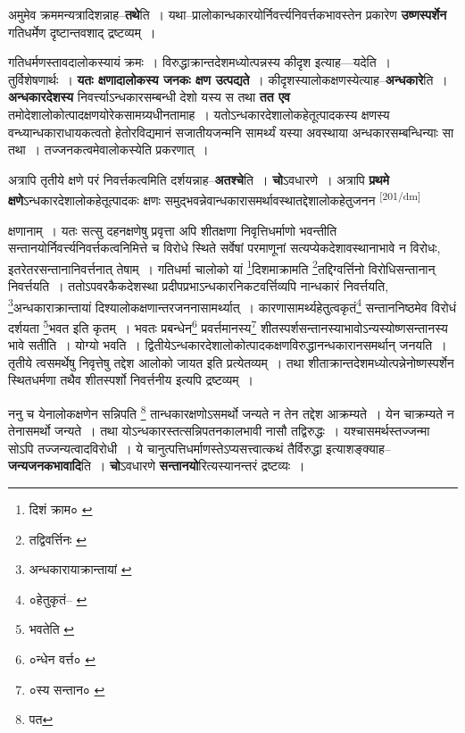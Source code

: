 \documentclass[article,12pt,a4paper]{memoir}
\begin{document}
	  \pstart अमुमेव क्रममन्यत्रादिशन्नाह--\textbf{तथे}ति । यथा--प्रालोकान्धकारयोर्निवर्त्त्यनिवर्त्तकभावस्तेन प्रकारेण \textbf{उष्णस्पर्शेन} गतिधर्मेण दृष्टान्तवशाद् द्रष्टव्यम् ।
	\pend
      

	  \pstart गतिधर्मणस्तावदालोकस्यायं क्रमः । विरुद्धाक्रान्तदेशमध्योत्पन्नस्य कीदृश इत्याह—यदेति । तुर्विशेषणार्थः । \textbf{यतः क्षणादालोकस्य जनकः क्षण उत्पद्यते} । कीदृशस्यालोकक्षणस्येत्याह--\textbf{अन्धकारे}ति । \textbf{अन्धकारदेशस्य} निवर्त्त्याऽन्धकारसम्बन्धी देशो यस्य स तथा \textbf{तत एव} तमोदेशालोकोत्पादक्षणयोरेकसामग्र्यधीनतामाह । यतोऽन्धकारदेशालोकहेतूत्पादकस्य क्षणस्य वन्ध्यान्धकाराधायकत्वतो हेतोरविद्यमानं सजातीयजन्मनि सामर्थ्यं यस्या अवस्थाया अन्धकारसम्बन्धिन्याः सा तथा । तज्जनकत्वमेवालोकस्येति प्रकरणात् ।
	\pend
      

	  \pstart अत्रापि तृतीये क्षणे परं निवर्त्तकत्वमिति दर्शयन्नाह--\textbf{अतश्चे}ति । \textbf{चो}ऽवधारणे । अत्रापि \textbf{प्रथमे क्षणे}ऽन्धकारदेशालोकहेतूत्पादकः क्षणः समुद्भवन्नेवान्धकारासमर्थावस्थातद्देशालोकहेतुजनन  \leavevmode\textsuperscript{\rmlatinfont\tiny [201/dm]} 
	  
	क्षणानाम् । यतः सत्सु दहनक्षणेषु प्रवृत्ता अपि शीतक्षणा निवृत्तिधर्माणो भवन्तीति सन्तानयोर्निवर्त्त्यनिवर्त्तकत्वनिमित्ते च विरोधे स्थिते सर्वेषां परमाणूनां सत्यप्येकदेशावस्थानाभावे न विरोधः, इतरेतरसन्तानानिवर्त्तनात् तेषाम् । गतिधर्मा चालोको यां \footnote{दिशं क्राम० \cite{dp-msC}}दिशमाक्रामति \footnote{तद्विवर्त्तिनः \cite{dp-msA}}तद्दिग्वर्त्तिनो विरोधिसन्तानान् निवर्त्तयति । ततोऽपवरकैकदेशस्था प्रदीपप्रभाऽन्धकारनिकटवर्त्तिव्यपि नान्धकारं निवर्त्तयति, \footnote{अन्धकारायाक्रान्तायां \cite{dp-msA}}अन्धकाराक्रान्तायां दिश्यालोकक्षणान्तरजननासामर्थ्यात् । कारणासामर्थ्यहेतुत्वकृतं\footnote{०हेतुकृतं--\cite{dp-msA} \cite{dp-edP} \cite{dp-edH} \cite{dp-edE} \cite{dp-edN}} सन्ताननिष्ठमेव विरोधं दर्शयता \footnote{भवतेति \cite{dp-edP} \cite{dp-edH}}भवत इति कृतम् । भवतः प्रबन्धेन\footnote{०न्धेन वर्त्त० \cite{dp-msA} \cite{dp-msB} \cite{dp-msD} \cite{dp-edP} \cite{dp-edH} \cite{dp-edE} \cite{dp-edN}} प्रवर्त्तमानस्य\footnote{०स्य सन्तान० \cite{dp-msC}} शीतस्पर्शसन्तानस्याभावोऽन्यस्योष्णसन्तानस्य भावे सतीति । योग्यो भवति । द्वितीयेऽन्धकारदेशालोकोत्पादकक्षणविरुद्धानन्धकारानसमर्थान् जनयति । तृतीये त्वसमर्थेषु निवृत्तेषु तद्देश आलोको जायत इति प्रत्येतव्यम् । तथा शीताक्रान्तदेशमध्योत्पन्नेनोष्णस्पर्शेन स्थितधर्मणा तथैव शीतस्पर्शो निवर्त्तनीय इत्यपि द्रष्टव्यम् ।
	\pend
      

	  \pstart ननु च येनालोकक्षणेन सन्निपति \footnote{पत} तान्धकारक्षणोऽसमर्थो जन्यते न तेन तद्देश आक्रम्यते । येन चाक्रम्यते न तेनासमर्थो जन्यते । तथा योऽन्धकारस्तत्सन्निपतनकालभावी नासौ तद्विरुद्धः । यश्चासमर्थस्तज्जन्मा सोऽपि तज्जन्यत्वादविरोधी । ये चानुत्पत्तिधर्माणस्तेऽप्यसत्त्वात्कथं तैर्विरुद्धा इत्याशङ्क्याह--\textbf{जन्यजनकभावादि}ति । \textbf{चो}ऽवधारणे \textbf{सन्तानयो}रित्यस्यानन्तरं द्रष्टव्यः ।
	\pend
      
\end{document}
